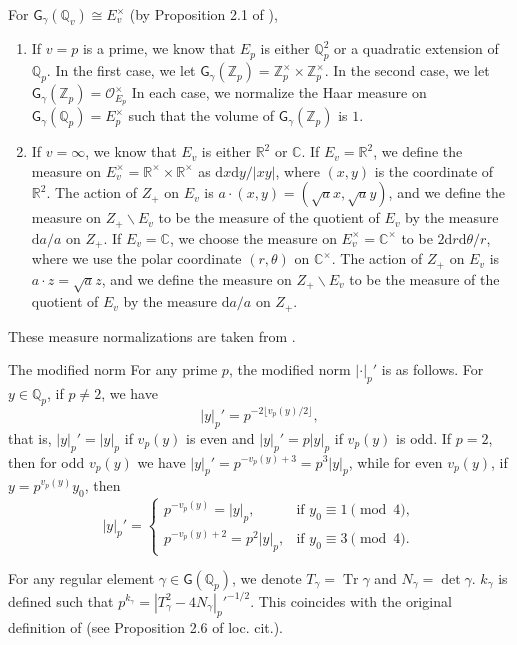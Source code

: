\documentclass[10pt,oneside,reqno]{amsart}
\makeatletter
\newcommand\rmd{\mathrm{d}}
\newcommand\cO{\mathcal{O}}
\newcommand\CC{\mathbb{C}}
\newcommand\QQ{\mathbb{Q}}
\newcommand\RR{\mathbb{R}}
\newcommand\ZZ{\mathbb{Z}}
\newcommand\G{\mathsf{G}}
\newcommand\bs{\backslash}
\DeclareMathOperator\Tr{Tr}
\def\subsection{\@startsection{subsection}{2}%
  \z@{3pt\@plus0pt}{-.5em}%
  {\normalfont\bfseries}}
\theoremstyle{THEOREM}
\theoremstyle{DEFINITION}
\theoremstyle{EXERCISE}
\numberwithin{equation}{section}
\makeatother
\begin{document}
For $\G_\gamma(\QQ_v)\cong E_v^\times$ (by Proposition 2.1 of \cite{cheng2025}),
\begin{enumerate}[itemsep=0pt,parsep=0pt,topsep=0pt,leftmargin=0pt,labelsep=3pt,itemindent=9pt,label=\textbullet]
  \item If $v=p$ is a prime, we know that $E_p$ is either $\QQ_p^2$ or a quadratic extension of $\QQ_p$. In the first case, we let $\G_\gamma(\ZZ_p)=\ZZ_p^\times \times \ZZ_p^\times$. In the second case, we let $\G_\gamma(\ZZ_p)=\cO_{E_p}^\times$
  In each case, we normalize the Haar measure on $\G_\gamma(\QQ_p)=E_p^\times$ such that the volume of $\G_\gamma(\ZZ_p)$ is $1$.
  \item If $v=\infty$, we know that $E_v$ is either $\RR^2$ or $\CC$. If $E_v=\RR^2$, we define the measure on $E_v^\times=\RR^\times \times \RR^\times$ as $\rmd x\rmd y/|xy|$, where $(x,y)$ is the coordinate of $\RR^2$. The action of $Z_+$ on $E_v$ is $a\cdot(x,y)=(\sqrt{a}x,\sqrt{a}y)$, and we define the measure on $Z_+\bs E_v$ to be the measure of the quotient of $E_v$ by the measure $\rmd a/a$ on $Z_+$. If $E_v=\CC$, we choose the  measure on $E_v^\times=\CC^\times$ to be $2\rmd r\rmd \theta/r$, where we use the polar coordinate $(r,\theta)$ on $\CC^\times$. The action of $Z_+$ on $E_v$ is $a\cdot z=\sqrt{a}z$, and we define the measure on $Z_+\bs E_v$ to be the measure of the quotient of $E_v$ by the measure $\rmd a/a$ on $Z_+$.
\end{enumerate} 
These measure normalizations are taken from \cite{langlands2004}.

\subsection{The modified norm}
For any prime $p$, the modified norm $|\cdot|_p'$ is as follows. For $y\in \QQ_p$, if $p\neq 2$, we have
\[
|y|_p'=p^{-2\lfloor v_p(y)/2\rfloor},
\]
that is, $|y|_p'=|y|_p$ if $v_p(y)$ is even and $|y|_p'=p|y|_p$ if $v_p(y)$ is odd. If $p=2$, then for odd $v_p(y)$ we have $|y|_p'=p^{-v_p(y)+3}=p^3|y|_p$, while for even $v_p(y)$, if $y=p^{v_p(y)}y_0$, then
\[
|y|_p'=\begin{cases}
  p^{-v_p(y)}=|y|_p, & \text{if $y_0\equiv 1\pmod 4$}, \\
  p^{-v_p(y)+2}=p^2|y|_p, & \text{if $y_0\equiv 3\pmod 4$}.
\end{cases}
\]

For any regular element $\gamma\in\G(\QQ_p)$, we denote $T_\gamma=\Tr\gamma$ and $N_\gamma=\det\gamma$. $k_\gamma$ is defined such that $p^{k_\gamma}=|T_\gamma^2-4N_\gamma|_p'^{-1/2}$. This coincides with the original definition of \cite{cheng2025} (see Proposition 2.6 of loc. cit.).
\end{document}
